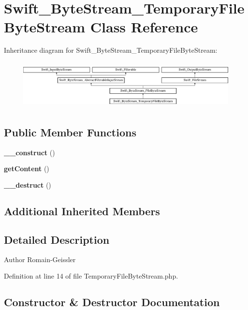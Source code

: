 \section{Swift\+\_\+\+Byte\+Stream\+\_\+\+Temporary\+File\+Byte\+Stream Class Reference}
\label{class_swift___byte_stream___temporary_file_byte_stream}
Inheritance diagram for Swift\+\_\+\+Byte\+Stream\+\_\+\+Temporary\+File\+Byte\+Stream\+:\begin{figure}[H]
\begin{center}
\leavevmode
\includegraphics[height=2.565865cm]{class_swift___byte_stream___temporary_file_byte_stream}
\end{center}
\end{figure}
\subsection*{Public Member Functions}
\begin{DoxyCompactItemize}
\item 
{\bf \+\_\+\+\_\+construct} ()
\item 
{\bf get\+Content} ()
\item 
{\bf \+\_\+\+\_\+destruct} ()
\end{DoxyCompactItemize}
\subsection*{Additional Inherited Members}


\subsection{Detailed Description}
\begin{DoxyAuthor}{Author}
Romain-\/\+Geissler 
\end{DoxyAuthor}


Definition at line 14 of file Temporary\+File\+Byte\+Stream.\+php.



\subsection{Constructor \& Destructor Documentation}
